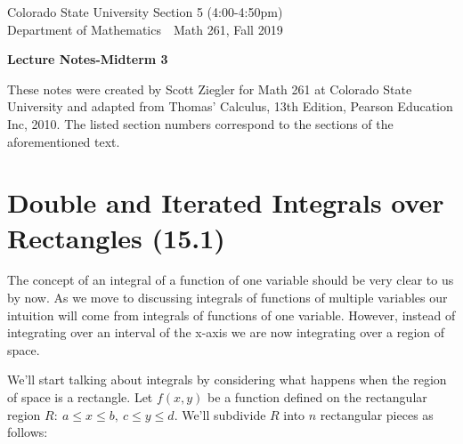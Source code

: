 \documentclass[12pt, letter]{article}
\theoremstyle{plain}
\numberwithin{theorem}{section}
\theoremstyle{definition}
\begin{document}

\noindent
Colorado State University \hfill Section 5 (4:00-4:50pm)\\
Department of Mathematics\ \  \hfill  Math 261, Fall 2019\\
\bigskip
\thispagestyle{empty}

\begin{center}
\begin{large}
\textbf{Lecture Notes-Midterm 3\\
}
\end{large}
\end{center}


\noindent These notes were created by Scott Ziegler for Math 261 at Colorado State University and adapted from Thomas' Calculus, 13th Edition, Pearson Education Inc, 2010. The listed section numbers correspond to the sections of the aforementioned text.



\section{Double and Iterated Integrals over Rectangles (15.1)}

The concept of an integral of a function of one variable should be very clear to us by now. As we move to discussing integrals of functions of multiple variables our intuition will come from integrals of functions of one variable. However, instead of integrating over an interval of the x-axis we are now integrating over a region of space.

\bigskip

We'll start talking about integrals by considering what happens when the region of space is a rectangle. Let $f(x,y)$ be a function defined on the rectangular region $R: \ a \leq x \leq b, \ c \leq y \leq d$. We'll subdivide $R$ into $n$ rectangular pieces as follows:

\bigskip
\end{document}
